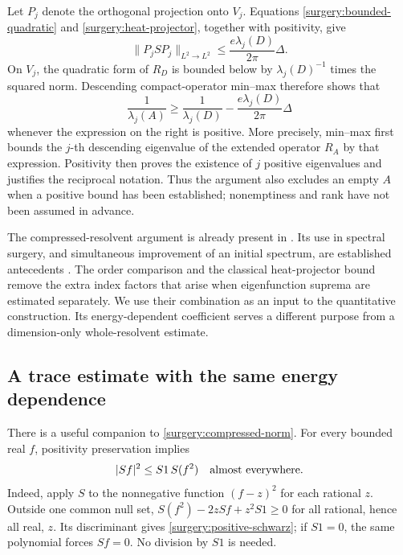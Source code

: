 \documentclass[11pt,reqno]{amsart}
\numberwithin{equation}{section}
\newcommand{\abs}[1]{\lvert#1\rvert}
\newcommand{\norm}[1]{\lVert#1\rVert}
\begin{document}
Let \(P_j\) denote the orthogonal projection onto \(V_j\).
Equations \eqref{surgery:bounded-quadratic} and
\eqref{surgery:heat-projector}, together with positivity, give
\begin{equation}
 \norm{P_jSP_j}_{L^2\to L^2}
 \le \frac{e\lambda_j(D)}{2\pi}\Delta.
 \label{surgery:compressed-norm}
\end{equation}
On \(V_j\), the quadratic form of \(R_D\) is bounded below by
\(\lambda_j(D)^{-1}\) times the squared norm.  Descending
compact-operator min--max therefore shows that
\begin{equation}
 \frac1{\lambda_j(A)}
 \ge \frac1{\lambda_j(D)}
       -\frac{e\lambda_j(D)}{2\pi}\Delta
 \label{surgery:inverse}
\end{equation}
whenever the expression on the right is positive.  More precisely,
min--max first bounds the \(j\)-th descending eigenvalue of the
extended operator \(R_A\) by that expression.  Positivity then proves
the existence of \(j\) positive eigenvalues and justifies the
reciprocal notation.  Thus the argument also excludes an empty \(A\)
when a positive bound has been established; nonemptiness and rank
have not been assumed in advance.

The compressed-resolvent argument is already present in
\cite[Theorem~3.4 and Lemma~3.5]{Bucur2003}.  Its use in spectral
surgery, and simultaneous improvement of an initial spectrum, are
established antecedents \cite{Bucur2012,BucurMazzoleni2015}.
The order comparison and the classical heat-projector bound remove
the extra index factors that arise when eigenfunction suprema are
estimated separately.  We use their combination as an input to the
quantitative construction.  Its energy-dependent coefficient serves
a different purpose from a dimension-only whole-resolvent estimate.

\subsection{A trace estimate with the same energy dependence}
\label{surgery:trace-section}

There is a useful companion to \eqref{surgery:compressed-norm}.
For every bounded real \(f\), positivity preservation implies
\begin{equation}
 \abs{Sf}^2\le S1\,S(f^2)\quad\hbox{almost everywhere}.
 \label{surgery:positive-schwarz}
\end{equation}
Indeed, apply \(S\) to the nonnegative function \((f-z)^2\) for each
rational \(z\).  Outside one common null set,
\(S(f^2)-2zSf+z^2S1\ge0\) for all rational, hence all real, \(z\).
Its discriminant gives \eqref{surgery:positive-schwarz}; if \(S1=0\),
the same polynomial forces \(Sf=0\).  No division by \(S1\) is needed.
\end{document}
